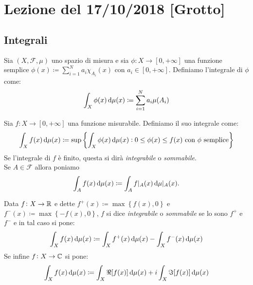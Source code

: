 \section{Lezione del 17/10/2018 [Grotto]}
\subsection{Integrali}
\begin{definition}
    Sia $ (X,\mathcal{F},\mu) $ uno spazio di misura e sia $ \phi\colon X\to [0,+\infty] $ una funzione semplice $ \phi(x) \coloneqq \sum_{i=1}^N a_i\chi_{A_i}(x)$ con $ a_i\in[0,+\infty] $. Definiamo l'integrale di $ \phi $ come:
    \[ \int_X \phi(x)\dif\mu(x) \coloneqq \sum_{i=1}^{N} a_i \mu(A_i) \]
\end{definition}

\begin{definition}
    Sia $ f\colon X\to [0,+\infty] $ una funzione misurabile. Definiamo il suo integrale come:
    \[ \int_X f(x)\dif\mu(x) \coloneqq \sup\left\{ \int_X \phi(x)\dif\mu(x) : 0 \leq \phi(x) \leq f(x) \text{ con $\phi$ semplice} \right\} \]
    Se l'integrale di $ f $ è finito, questa si dirà \emph{integrabile} o \emph{sommabile}. \\
    Se $ A \in \mathcal{F} $ allora poniamo 
    \[
        \int_A f(x)\dif\mu(x) \coloneqq \int_A f\rvert_A(x) \dif\mu\rvert_A(x).
    \]
\end{definition}

\begin{definition}[Integrale]
    Data $ f\colon X\to\mathbb{R} $ e dette $ f^+(x) \coloneqq \max\left\{f(x),0\right\} $ e $ f^-(x) \coloneqq \max\left\{-f(x), 0\right\} $, $ f $ si dice \emph{integrabile} o \emph{sommabile} se lo sono $ f^+ $ e $ f^- $ e in tal caso si pone:
    \[ \int_X f(x)\dif\mu(x) \coloneqq \int_X f^+(x)\dif\mu(x) - \int_X f^-(x)\dif\mu(x) \]
    Se infine $ f\colon X\to\mathbb{C} $ si pone:
    \[ \int_X f(x)\dif\mu(x) \coloneqq \int_X\Re[f(x)]\dif\mu(x) + i\int_X\Im[f(x)]\dif\mu(x) \]
\end{definition}

